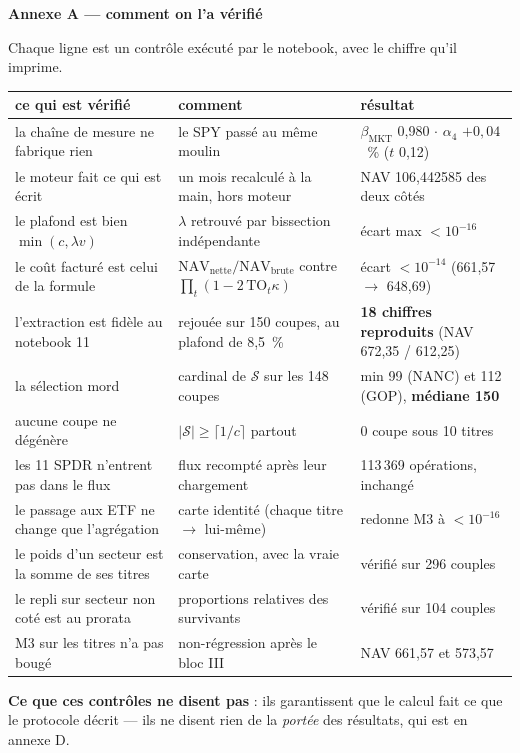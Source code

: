 \documentclass[9pt,a4paper]{extarticle}
\begin{document}
\vspace{0.8mm}
{\color{bleu}\bfseries Annexe A --- comment on l'a vérifié}\par
\vspace{0.6mm}
{\footnotesize
Chaque ligne est un contrôle exécuté par le notebook, avec le chiffre qu'il imprime.\par}
\vspace{0.4mm}
{\centering\scriptsize
\begin{tabular}{@{}l l l@{}}
\toprule
\textbf{ce qui est vérifié} & \textbf{comment} & \textbf{résultat} \\
\midrule
la chaîne de mesure ne fabrique rien & le SPY passé au même moulin & $\beta_{\text{MKT}}$ 0,980 $\cdot$ $\alpha_4$ $+0{,}04$~\% ($t$ 0,12) \\
le moteur fait ce qui est écrit & un mois recalculé à la main, hors moteur & NAV 106,442585 des deux côtés \\
le plafond est bien $\min(c,\lambda v)$ & $\lambda$ retrouvé par bissection indépendante & écart max $<10^{-16}$ \\
le coût facturé est celui de la formule & $\mathrm{NAV}_{\text{nette}}/\mathrm{NAV}_{\text{brute}}$ contre $\prod_t(1-2\,\mathrm{TO}_t\kappa)$ & écart $<10^{-14}$ (661,57 $\to$ 648,69) \\
l'extraction est fidèle au notebook 11 & rejouée sur 150 coupes, au plafond de 8,5~\% & \textbf{18 chiffres reproduits} (NAV 672,35 / 612,25) \\
la sélection mord & cardinal de $\mathcal S$ sur les 148 coupes & min 99 (NANC) et 112 (GOP), \textbf{médiane 150} \\
aucune coupe ne dégénère & $\lvert\mathcal S\rvert \ge \lceil 1/c\rceil$ partout & 0 coupe sous 10 titres \\
les 11 SPDR n'entrent pas dans le flux & flux recompté après leur chargement & 113\,369 opérations, inchangé \\
le passage aux ETF ne change que l'agrégation & carte identité (chaque titre $\to$ lui-même) & redonne M3 à $<10^{-16}$ \\
le poids d'un secteur est la somme de ses titres & conservation, avec la vraie carte & vérifié sur 296 couples \\
le repli sur secteur non coté est au prorata & proportions relatives des survivants & vérifié sur 104 couples \\
M3 sur les titres n'a pas bougé & non-régression après le bloc III & NAV 661,57 et 573,57 \\
\bottomrule
\end{tabular}\par}
\vspace{0.5mm}
{\footnotesize\color{grisf} \textbf{Ce que ces contrôles ne disent pas} : ils garantissent que le calcul fait
ce que le protocole décrit --- ils ne disent rien de la \emph{portée} des résultats, qui est en annexe D.}\par
\end{document}
